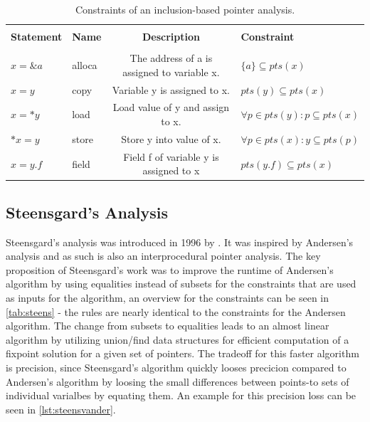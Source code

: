 \begin{table}
    \begin{center}
        \caption{Constraints of an inclusion-based pointer analysis.}
        \label{tab:ander}
        \begin{tabular}{l|l|c|l}
            \hline                                                                                                                         \\
            \textbf{Statement} & \textbf{Name} & \textbf{Description}                        & \textbf{Constraint}                         \\
            \hline                                                                                                                         \\
            $x = \&a$          & alloca        & The address of a is assigned to variable x. & $\{a\} \subseteq pts(x)$                    \\
            $x = y$            & copy          & Variable y is assigned to x.                & $pts(y) \subseteq pts(x)$                   \\
            $x = *y$           & load          & Load value of y and assign to x.            & $\forall p \in pts(y) \colon p \subseteq pts(x)$ \\
            $*x = y$           & store         & Store y into value of x.                    & $\forall p \in pts(x) \colon y \subseteq pts(p)$ \\
            $x = y.f$          & field         & Field f of variable y is assigned to x      & $pts(y.f) \subseteq pts(x)$                 \\
        \end{tabular}
    \end{center}
\end{table}

\subsection{Steensgard's Analysis}
Steensgard's analysis was introduced in 1996 by \cite{steensgaard1996points}. It was inspired by Andersen's analysis and as such is also an interprocedural pointer analysis.
The key proposition of Steensgard's work was to improve the runtime of Andersen's algorithm by using equalities instead of subsets for the constraints that are used as inputs for the algorithm, an overview for the constraints can be seen in \autoref{tab:steens} - the rules are nearly identical to the constraints for the Andersen algorithm.
The change from subsets to equalities leads to an almost linear algorithm by utilizing union/find data structures for efficient computation of a fixpoint solution for a given set of pointers.
The tradeoff for this faster algorithm is precision, since Steensgard's algorithm quickly looses precicion compared to Andersen's algorithm by loosing the small differences between points-to sets of individual varialbes by equating them. An example for this precision loss can be seen in \autoref{lst:steensvander}.

